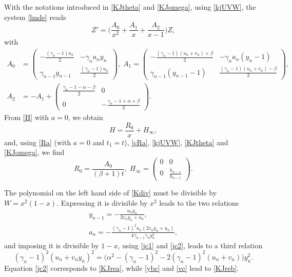 \documentclass[10pt, reqno]{amsart}
\numberwithin{equation}{section}
\numberwithin{equation}{section}
\begin{document}
With the notations introduced in \eqref{KJtheta} and \eqref{KJomega}, using \eqref{kjUVW}, the system \eqref{lmde} reads
\begin{equation*}
Z'=\Big(\frac{A_0}{x^2}+\frac{A_1}{x}+\frac{A_2}{x-1}\Big)Z,
\end{equation*}
with
\begin{align}
A_0&=\begin{pmatrix} -\frac{(\gamma_n-1)u_n}{2}&-\gamma_na_ny_n\\ \gamma_{n-1}y_{n-1}&\frac{(\gamma_n-1)u_n}{2}\end{pmatrix},\;
A_1=\begin{pmatrix}-\frac{(\gamma_n-1)(u_n+v_n)+\beta}{2}&-\gamma_na_n(y_n-1)\\\gamma_{n-1}(y_{n-1}-1)&\frac{(\gamma_n-1)(u_n+v_n)-\beta}{2}\end{pmatrix},\nonumber\\
A_2&=-A_1+\begin{pmatrix} \frac{\gamma_n-1-\alpha-\beta}{2}&0\\0&-\frac{\gamma_n-1+\alpha+\beta}{2}\end{pmatrix}\label{KJA2}.
\end{align}
From \eqref{H} with $a=0$, we obtain
\begin{equation*}
H=\frac{R_0}{x}+H_\infty,
\end{equation*}
and, using \eqref{Ra} (with $a=0$ and $t_1=t$), \eqref{cRa}, \eqref{kjUVW}, \eqref{KJtheta} and \eqref{KJomega}, we find 
\begin{equation}
R_0=\frac{A_0}{(\beta+1)t},\;H_\infty=\begin{pmatrix} 0&0\\0&\frac{\dot{h}_{n-1}}{h_{n-1}}\end{pmatrix}\label{KJH0I}.
\end{equation}

The polynomial on the left hand side of \eqref{Kdiv} must be divisible by $W=x^2(1-x)$. Expressing it is divisible by $x^2$ leads to the two relations
\begin{gather}
y_{n-1}=-\frac{u_ny_n}{2v_ny_n+u_n},\label{jc1}\\
a_n=-\frac{(\gamma_n-1)^2u_n(2v_ny_n+u_n)}{4\gamma_{n-1}\gamma_n y_n^2},\label{jc2}
\end{gather}
and imposing it is divisible by $1-x$, using \eqref{jc1} and \eqref{jc2}, leads to a third relation
\begin{equation}
(\gamma_n-1)^2(u_n+v_n y_n)^2=\Big(\alpha^2-(\gamma_n-1)^2-2(\gamma_n-1)^2(u_n+v_n)\Big)y_n^2\label{jc3}.
\end{equation}
Equation \eqref{jc2} corresponds to \eqref{KJrea}, while \eqref{ybc} and \eqref{vc} lead to \eqref{KJreb}.
\end{document}
